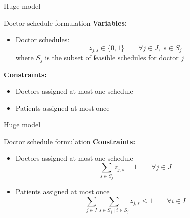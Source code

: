 \documentclass{beamer}
\begin{document}
\begin{frame}{Huge model}
    \begin{block}{Doctor schedule formulation}
        \textbf{Variables:}
        \begin{itemize}
            \item Doctor schedules: 
            \[
            z_{j,s} \in \{0,1\} \qquad \forall j \in J, \; s \in S_j
            \]
            where $S_j$ is the subset of feasible schedules for doctor $j$
        \end{itemize}
        \textbf{Constraints:}
        \begin{itemize}
            \item Doctors assigned at most one schedule
            \item Patients assigned at most once
        \end{itemize}
    \end{block}
\end{frame}

\begin{frame}{Huge model}
    \begin{block}{Doctor schedule formulation}
        \textbf{Constraints:}
        \begin{itemize}
            \item Doctors assigned at most one schedule
            \begin{equation*}
                \sum_{s\in S_j } z_{j,s} = 1 \qquad \forall j \in J
            \end{equation*}
            \item Patients assigned at most once
            \begin{equation*}
                \sum_{j \in J} \sum_{s\in S_j\;|\; i\in S_j} z_{j,s} \le 1 \qquad \forall i \in I
            \end{equation*}
        \end{itemize}
    \end{block}
\end{frame}
\end{document}
